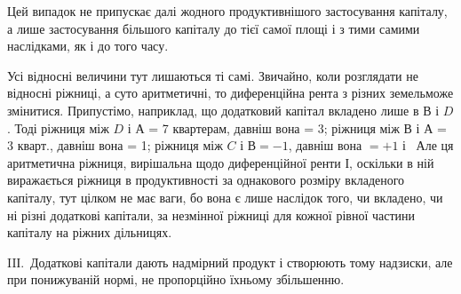 
Цей випадок не припускає далі жодного продуктивнішого застосування
капіталу, а лише застосування більшого капіталу до тієї самої площі і з тими
самими наслідками, як і до того часу.

Усі відносні величини тут лишаються ті самі. Звичайно, коли розглядати
не відносні ріжниці, а суто аритметичні, то диференційна рента з різних земельможе
змінитися. Припустімо, наприклад, що додатковий капітал вкладено лише
в $В$ і $D$. Тоді ріжниця між $D$ і $А$ = 7 квартерам, давніш вона = 3; ріжниця
між $В$ і $А$ = 3 кварт., давніш вона = 1; ріжниця між $C$ і $В = - 1$, давніш
вона $= + 1$ і~ Але ця аритметична ріжниця, вирішальна щодо диференційної
ренти І, оскільки в ній виражається ріжниця в продуктивності за однакового
розміру вкладеного капіталу, тут цілком не має ваги, бо вона є лише
наслідок того, чи вкладено, чи ні різні додаткові капітали, за незмінної ріжниці
для кожної рівної частини капіталу на ріжних дільницях.

IIІ.~Додаткові капітали дають надмірний продукт і створюють тому надзиски,
але при понижуваній нормі, не пропорційно їхньому збільшенню.

